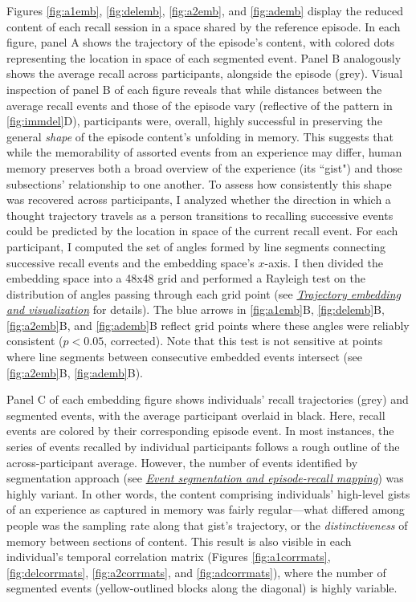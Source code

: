 \documentclass{article}
\begin{document}
Figures \ref{fig:a1emb}, \ref{fig:delemb}, \ref{fig:a2emb}, and \ref{fig:ademb} display the reduced content of each recall session in a space shared by the reference episode.  In each figure, panel A shows the trajectory of the episode's content, with colored dots representing the location in space of each segmented event.  Panel B analogously shows the average recall across participants, alongside the episode (grey).  Visual inspection of panel B of each figure reveals that while distances between the average recall events and those of the episode vary (reflective of the pattern in \ref{fig:immdel}D), participants were, overall, highly successful in preserving the general \textit{shape} of the episode content's unfolding in memory.  This suggests that while the memorability of assorted events from an experience may differ, human memory preserves both a broad overview of the experience (its ``gist") and those subsections' relationship to one another.  To assess how consistently this shape was recovered across participants, I analyzed whether the direction in which a thought trajectory travels as a person transitions to recalling successive events could be predicted by the location in space of the current recall event.  For each participant, I computed the set of angles formed by line segments connecting successive recall events and the embedding space's $x$-axis.  I then divided the embedding space into a 48x48 grid and performed a Rayleigh test on the distribution of angles passing through each grid point (see \hyperref[sec:embedding]{\textit{Trajectory embedding and visualization}} for details). The blue arrows in \ref{fig:a1emb}B, \ref{fig:delemb}B, \ref{fig:a2emb}B, and \ref{fig:ademb}B reflect grid points where these angles were reliably consistent ($p < 0.05$, corrected).  Note that this test is not sensitive at points where line segments between consecutive embedded events intersect (see \ref{fig:a2emb}B, \ref{fig:ademb}B).  

Panel C of each embedding figure shows individuals' recall trajectories (grey) and segmented events, with the average participant overlaid in black. Here, recall events are colored by their corresponding episode event.  In most instances, the series of events recalled by individual participants follows a rough outline of the across-participant average.  However, the number of events identified by segmentation approach (see \hyperref[sec:eventseg]{\textit{Event segmentation and episode-recall mapping}}) was highly variant.  In other words, the content comprising individuals' high-level gists of an experience as captured in memory was fairly regular—what differed among people was the sampling rate along that gist's trajectory, or the \textit{distinctiveness} of memory between sections of content.  This result is also visible in each individual's temporal correlation matrix (Figures \ref{fig:a1corrmats}, \ref{fig:delcorrmats}, \ref{fig:a2corrmats}, and \ref{fig:adcorrmats}), where the number of segmented events (yellow-outlined blocks along the diagonal) is highly variable.
\end{document}
